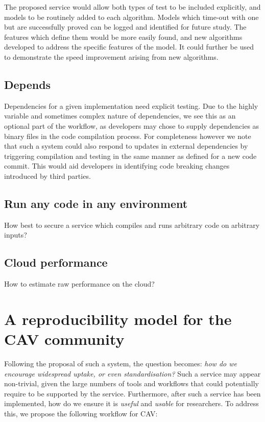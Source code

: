 \documentclass{llncs}
\begin{document}
The proposed service would allow both types of test to be included explicitly,
and models to be routinely added to each algorithm. Models which time-out with 
one but are successfully proved can be logged and identified for future study.
The features which define them would be more easily found, and new algorithms
developed to address the specific features of the model. It could further be 
used to demonstrate the speed improvement arising from new algorithms.

\subsection{Depends}

Dependencies for a given implementation need explicit
testing. Due to the highly variable and sometimes complex nature of
dependencies, we see this as an optional part of the workflow, as
developers may chose to supply dependencies as binary files in the
code compilation process. For completeness however we note that such a
system could also respond to updates in external dependencies by
triggering compilation and testing in the same manner as defined for a
new code commit. This would aid developers in identifying code
breaking changes introduced by third parties.


\subsection{Run any code in any environment}
How best to secure a service which compiles and runs arbitrary code on arbitrary inputs?

\subsection{Cloud performance}
How to estimate raw performance on the cloud?

\section{A reproducibility model for the CAV community}\label{rollout}

Following the proposal of such a system, the question becomes:
{\emph{how do we encourage widespread uptake, or even standardisation?}}
Such a service may appear non-trivial, given the large numbers of
tools and workflows
that could potentially require to be supported by the service. Furthermore,
after such a service has been implemented, how do we ensure it is
\emph{useful} and \emph{usable} for researchers. To address this, we
propose the following workflow for CAV:
\end{document}
